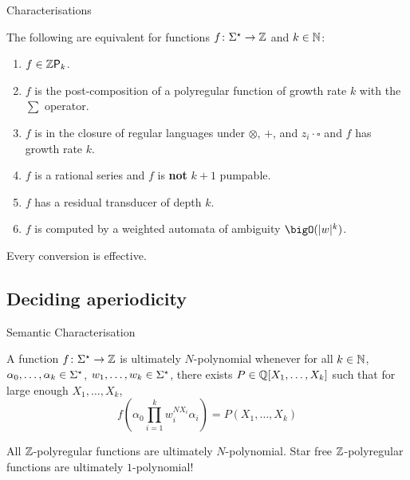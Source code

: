 \documentclass{beamer}
\begin{document}
\begin{frame}{Characterisations}
    \begin{theorem}
        The following are equivalent for functions $f \colon \words \to \Rel$
        and $k \in \mathbb{N}$:
        \begin{enumerate}
            \item $f \in \Zpoly[k]$.
            \item $f$ is the post-composition of a 
                polyregular function of growth rate $k$ with the $\sum$ operator.
            \item $f$ is in the closure of regular languages
                under $\otimes$, $+$, and $z_i \cdot \square$
                and $f$ has growth rate $k$.
            \item $f$ is a rational series and
                $f$ is \textbf{not} $k+1$ pumpable.
            \item $f$ has a residual transducer of depth $k$.
            \item $f$ is computed by a weighted automata of
                ambiguity $\bigO(|w|^k)$.
        \end{enumerate}

        Every conversion is effective.
    \end{theorem}
\end{frame}

\subsection{Deciding aperiodicity}

\begin{frame}{Semantic Characterisation}
    \begin{definition}
        A function $f \colon \words \to \Rel$ is ultimately $N$-polynomial
        whenever for all 
        $k \in \mathbb{N}$,
        $\alpha_0, \dots, \alpha_k \in \words$,
        $w_1, \dots, w_k \in \words$, there exists $P \in \mathbb{Q}[X_1, \dots, X_k]$
        such that  for large enough $X_1, \dots, X_k$,
        \begin{equation*}
            f(\alpha_0 \prod_{i = 1}^k w_i^{N X_i} \alpha_i)
            =
            P(X_1, \dots, X_k)
        \end{equation*}
    \end{definition}
    \pause
    All $\mathbb{Z}$-polyregular functions are ultimately $N$-polynomial.
    \pause
    Star free $\mathbb{Z}$-polyregular functions are ultimately $1$-polynomial!
\end{frame}
\end{document}
